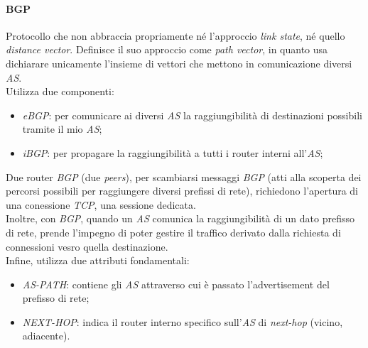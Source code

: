 \paragraph{BGP}
Protocollo che non abbraccia propriamente né l'approccio \textit{link state}, né quello \textit{distance vector}. Definisce il suo approccio come \textit{path vector}, in quanto usa dichiarare unicamente l'insieme di vettori che mettono in comunicazione diversi \textit{AS}. \\
Utilizza due componenti:
\begin{itemize}
	\item \textit{eBGP}: per comunicare ai diversi \textit{AS} la raggiungibilità di destinazioni possibili tramite il mio \textit{AS};
	\item \textit{iBGP}: per propagare la raggiungibilità a tutti i router interni all'\textit{AS};
\end{itemize}
Due router \textit{BGP} (due \textit{peers}), per scambiarsi messaggi \textit{BGP} (atti alla scoperta dei percorsi possibili per raggiungere diversi prefissi di rete), richiedono l'apertura di una conessione \textit{TCP}, una sessione dedicata. \\
Inoltre, con \textit{BGP}, quando un \textit{AS} comunica la raggiungibilità di un dato prefisso di rete, prende l'impegno di poter gestire il traffico derivato dalla richiesta di connessioni vesro quella destinazione. \\
Infine, utilizza due attributi fondamentali:
\begin{itemize}
	\item \textit{AS-PATH}: contiene gli \textit{AS} attraverso cui è passato l'advertisement del prefisso di rete;
	\item \textit{NEXT-HOP}: indica il router interno specifico sull'\textit{AS} di \textit{next-hop} (vicino, adiacente).
\end{itemize}